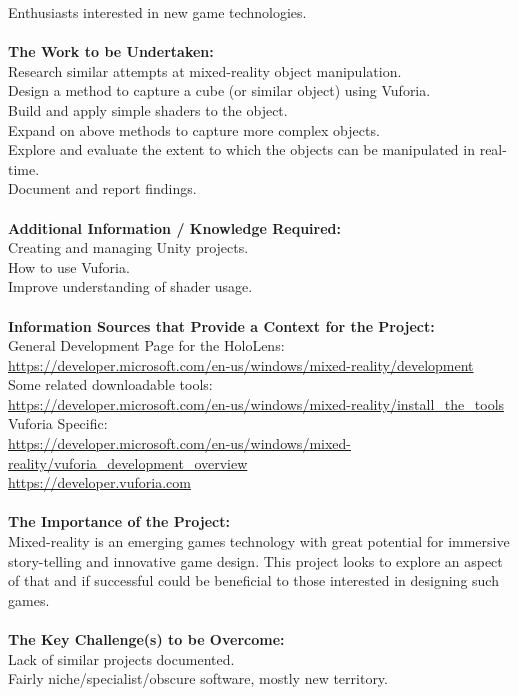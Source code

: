 \documentclass[12pt,a4paper,oneside]{article}
\begin{document}
\begin{appendices}
Enthusiasts interested in new game technologies. \\ \\
\textbf{The Work to be Undertaken:} \\
Research similar attempts at mixed-reality object manipulation. \\
Design a method to capture a cube (or similar object) using Vuforia. \\
Build and apply simple shaders to the object. \\
Expand on above methods to capture more complex objects. \\
Explore and evaluate the extent to which the objects can be manipulated in real-time. \\
Document and report findings. \\ \\
\textbf{Additional Information / Knowledge Required:} \\
Creating and managing Unity projects. \\
How to use Vuforia. \\
Improve understanding of shader usage. \\ \\
\textbf{Information Sources that Provide a Context for the Project:} \\
General Development Page for the HoloLens: \\
\url{https://developer.microsoft.com/en-us/windows/mixed-reality/development} \\
Some related downloadable tools: \\
\url{https://developer.microsoft.com/en-us/windows/mixed-reality/install_the_tools} \\
Vuforia Specific: \\
\url{https://developer.microsoft.com/en-us/windows/mixed-reality/vuforia_development_overview} \\
\url{https://developer.vuforia.com} \\ \\
\textbf{The Importance of the Project:} \\
Mixed-reality is an emerging games technology with great potential for immersive story-telling and innovative game design. This project looks to explore an aspect of that and if successful could be beneficial to those interested in designing such games. \\ \\
\textbf{The Key Challenge(s) to be Overcome:} \\
Lack of similar projects documented. \\
Fairly niche/specialist/obscure software, mostly new territory. \\
\newpage


\end{appendices}
\end{document}
